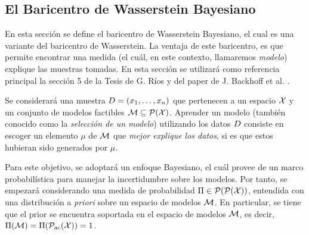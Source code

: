 {{		\subsection{El Baricentro de Wasserstein Bayesiano}\label{ssec:baricentro-Wasserstein-Bayesiano}
		{
			En esta sección se define el baricentro de Wasserstein Bayesiano, el cual es una variante del baricentro de Wasserstein. La ventaja de este baricentro, es que permite encontrar una medida (el cuál, en este contexto, llamaremos \emph{modelo}) explique las muestras tomadas.
			En esta sección se utilizará como referencia principal la sección 5 de la Tesis de G. Ríos \cite{rios2020contributions} y del paper de J. Backhoff et al.  \cite{backhoff2022bayesian}.

			Se considerará una muestra $\Data = \left(x_1,\ldots, x_n \right)$ que pertenecen a un espacio $\cX$ y un conjunto de modelos factibles
			$\Models \subseteq \ProbSpace[\cX]$. Aprender un modelo (también conocido como la \emph{selección de un modelo}) utilizando los datos $\Data$  consiste en escoger un elemento $\mu$ de $\Models$ que \emph{mejor explique los datos}, si es que estos hubieran sido generados por $\mu$.

			Para este objetivo, se adoptará un enfoque Bayesiano, el cuál provee de un marco probabilística para manejar la incertidumbre sobre los modelos. Por tanto, se empezará considerando una medida de probabilidad $\Pi \in \ProbSpace[\ProbSpace[\cX] ] $, entendida con una distribución a \textit{priori} sobre un espacio de modelos $\Models$. En particular, se tiene que el prior se encuentra soportada en el espacio de modelos $\Models$, es decir, $\Pi(\Models) = \Pi(\ProbSpaceAC[\cX] ) = 1$.

}}}
